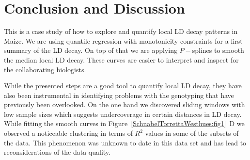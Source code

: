 \documentclass[twoside]{report}
\begin{document}

\section{Conclusion and Discussion}
This is a case study of how to explore and quantify local LD decay patterns in Maize. We are using
quantile regression with monotonicity constraints for a first summary of the LD decay. 
On top of that we are applying $P-$splines to smooth the median local LD decay. These curves 
are easier to interpret and inspect for the collaborating biologists. 

While the presented steps are a good tool to quantify local LD decay, they have also been 
	instrumental in identifying problems with the genotyping that have previously been 
	overlooked. On the one hand we discovered sliding windows with low sample sizes which suggests 
	undercoverage in certain distances in LD decay. 
	While fitting the smooth curves in Figure~\ref{SchnabelTorrettaWesthues:fig1}~D we observed a noticeable clustering 
	in terms of $R^2$ values in some of the subsets of the data. This phenomenon was unknown 
	to date in this data set and has lead to reconsiderations of the data quality.
\end{document}
